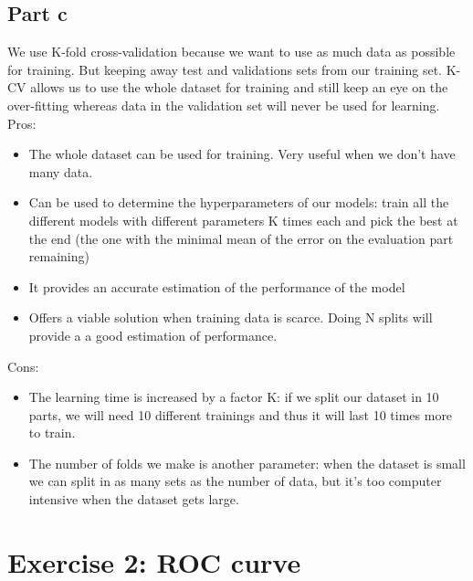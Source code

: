 \documentclass[a4paper, 10pt]{article}
\begin{document}
\subsection{Part c}
We use K-fold cross-validation because we want to use as much data as possible for training.
But keeping away test and validations sets from our training set. K-CV allows us to use the whole
dataset for training and still keep an eye on the over-fitting whereas data in the validation set will never
be used for learning.
\\
Pros: 
\begin{itemize}
    \item The whole dataset can be used for training. Very useful when we don't have many data.
    \item Can be used to determine the hyperparameters of our models: train all the
    different models with different parameters K times each and pick the best at the end
    (the one with the minimal mean of the error on the evaluation part remaining)
    \item It provides an accurate estimation of the performance of the model
    \item Offers a viable solution when training data is scarce. Doing N splits will provide a a good estimation of 
    performance.
\end{itemize}
Cons:
\begin{itemize}
    \item The learning time is increased by a factor K: if we split our dataset in 10 parts, we 
    will need 10 different trainings and thus it will last 10 times more to train.
    \item The number of folds we make is another parameter: when the dataset is small we can split in
    as many sets as the number of data, but it's too computer intensive when the dataset gets large.

\end{itemize}
\section{Exercise 2: ROC curve}
\end{document}

